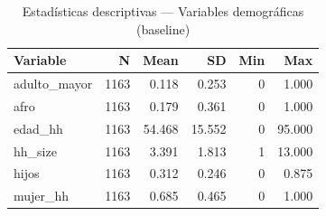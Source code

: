 \begin{table}[!h]
\centering
\caption{Estadísticas descriptivas — Variables demográficas (baseline)}
\centering
\begin{tabular}[t]{lrrrrr}
\toprule
Variable & N & Mean & SD & Min & Max\\
\midrule
adulto\_mayor & 1163 & 0.118 & 0.253 & 0 & 1.000\\
afro & 1163 & 0.179 & 0.361 & 0 & 1.000\\
edad\_hh & 1163 & 54.468 & 15.552 & 0 & 95.000\\
hh\_size & 1163 & 3.391 & 1.813 & 1 & 13.000\\
hijos & 1163 & 0.312 & 0.246 & 0 & 0.875\\
\addlinespace
mujer\_hh & 1163 & 0.685 & 0.465 & 0 & 1.000\\
\bottomrule
\end{tabular}
\end{table}

